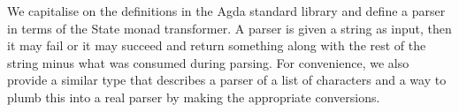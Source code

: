 We capitalise on the definitions in the Agda standard library and define
a parser in terms of the State monad transformer. A parser is given a string
as input, then it may fail or it may succeed and return something along with
the rest of the string minus what was consumed during parsing. For convenience,
we also provide a similar type that describes a parser of a list of characters
and a way to plumb this into a real parser by making the appropriate conversions.

\begin{code}%
\>[0]\AgdaSpace{}%
\AgdaSpace{}%
\<%
\\
\>[0][@{}l@{\AgdaIndent{0}}]%
\>[2]\AgdaSpace{}%
\AgdaSymbol{:}\AgdaSpace{}%
\AgdaSpace{}%
\AgdaSpace{}%
\<%
\\
%
\>[2]\AgdaSpace{}%
\AgdaSymbol{=}\AgdaSpace{}%
\AgdaSpace{}%
\AgdaSymbol{(}\AgdaSpace{}%
\AgdaSymbol{)}\AgdaSpace{}%
\<%
\\
\>[0]\<%
\\
%
\>[2]\AgdaSpace{}%
\AgdaSymbol{:}\AgdaSpace{}%
\AgdaSpace{}%
\AgdaSpace{}%
\<%
\\
%
\>[2]\AgdaSpace{}%
\AgdaSymbol{=}\AgdaSpace{}%
\AgdaSpace{}%
\AgdaSpace{}%
\<%
\\
\>[0]\<%
\\
%
\>[2]\AgdaSpace{}%
\AgdaSymbol{:}\AgdaSpace{}%
\AgdaSpace{}%
\AgdaSpace{}%
\AgdaSpace{}%
\AgdaSpace{}%
\<%
\\
%
\>[2]\AgdaOperator{\AgdaFunction{→[}}\AgdaSpace{}%
\AgdaSpace{}%
\AgdaOperator{\AgdaFunction{]→}}%
\>[12]\AgdaSpace{}%
\AgdaSymbol{=}%
\>[139I]\<%
\\
\>[139I][@{}l@{\AgdaIndent{0}}]%
\>[20]\AgdaSymbol{(}\AgdaSpace{}%
\AgdaOperator{\AgdaInductiveConstructor{,}}\AgdaSpace{}%
\AgdaSymbol{)}\AgdaSpace{}%
\AgdaSpace{}%
\AgdaSymbol{(}\AgdaSpace{}%
\AgdaSpace{}%
\AgdaSymbol{)}\AgdaSpace{}%
\<%
\\
%
\>[20]\AgdaSpace{}%
\AgdaSymbol{((}\AgdaSpace{}%
\AgdaOperator{\AgdaInductiveConstructor{,}}\AgdaSpace{}%
\AgdaSpace{}%
\AgdaSymbol{))}\<%
\\
\>[.][@{}l@{}]\<[139I]%
\>[18]\AgdaSpace{}%
\AgdaSpace{}%
\<%
\end{code}

